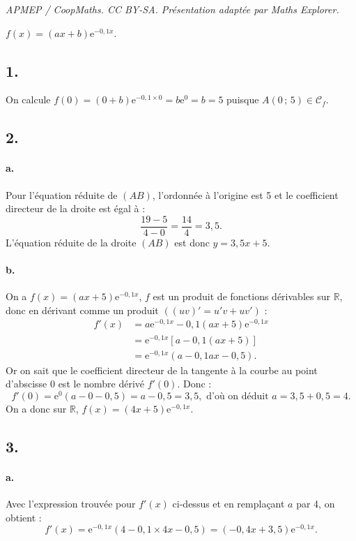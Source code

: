 \documentclass[10pt]{article}
\providecommand{\e}{{\mathrm{e}}}
\begin{document}
\noindent\textit{APMEP / CoopMaths. CC BY-SA. Présentation adaptée par Maths Explorer.}\par\medskip
\( f(x) = (ax + b)\e^{-0{,}1x} \).

\subsection*{1.}

On calcule \( f(0) = (0 + b)\e^{-0{,}1 \times 0} = b\e^0 = b = 5 \) puisque \( A(0\,;\,5) \in \mathcal{C}_f \).

\subsection*{2.}

\paragraph{a.} Pour l'équation réduite de \( (AB) \), l'ordonnée à l'origine est 5 et le coefficient directeur de la droite est égal à :
\[
\dfrac{19 - 5}{4 - 0} = \dfrac{14}{4} = 3{,}5.
\]
L'équation réduite de la droite \( (AB) \) est donc \( y = 3{,}5x + 5 \).

\paragraph{b.} On a \( f(x) = (ax + 5) \e^{-0{,}1x} \), \( f \) est un produit de fonctions dérivables sur \( \mathbb{R} \), donc en dérivant comme un produit \( ( (uv)' = u'v + uv' ) \) :
\begin{align*}
f'(x) &= a\e^{-0{,}1x} - 0{,}1(ax + 5)\e^{-0{,}1x} \\
&= \e^{-0{,}1x} [a - 0{,}1(ax + 5)] \\
&= \e^{-0{,}1x}(a - 0{,}1ax - 0{,}5).
\end{align*}
Or on sait que le coefficient directeur de la tangente à la courbe au point d'abscisse 0 est le nombre dérivé \( f'(0) \). Donc :
\[
f'(0) = \e^0(a - 0 - 0{,}5) = a - 0{,}5 = 3{,}5, \text{ d'où on déduit } a = 3{,}5 + 0{,}5 = 4.
\]
On a donc sur \( \mathbb{R} \), \( f(x) = (4x + 5)\e^{-0{,}1x} \).

\subsection*{3.}

\paragraph{a.} Avec l'expression trouvée pour \( f'(x) \) ci-dessus et en remplaçant \( a \) par 4, on obtient :
\[
f'(x) = \e^{-0{,}1x}(4 - 0{,}1 \times 4x - 0{,}5) = (-0{,}4x + 3{,}5)\e^{-0{,}1x}.
\]
\end{document}
